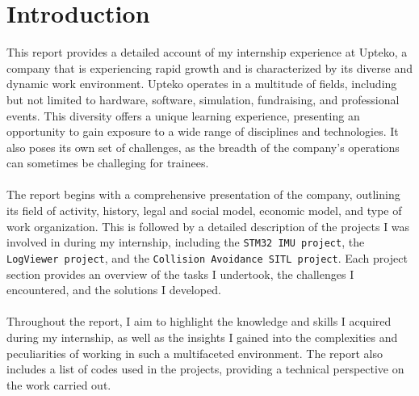 \chapter*{Introduction}

This report provides a detailed account of my internship experience at Upteko, a company that is experiencing rapid growth and is characterized by its diverse and dynamic work environment. Upteko operates in a multitude of fields, including but not limited to hardware, software, simulation, fundraising, and professional events. This diversity offers a unique learning experience, presenting an opportunity to gain exposure to a wide range of disciplines and technologies. It also poses its own set of challenges, as the breadth of the company's operations can sometimes be challeging for trainees.
\\ \\
The report begins with a comprehensive presentation of the company, outlining its field of activity, history, legal and social model, economic model, and type of work organization. This is followed by a detailed description of the projects I was involved in during my internship, including the \texttt{STM32 IMU project}, the \texttt{LogViewer project}, and the \texttt{Collision Avoidance SITL project}. Each project section provides an overview of the tasks I undertook, the challenges I encountered, and the solutions I developed.
\\ \\
Throughout the report, I aim to highlight the knowledge and skills I acquired during my internship, as well as the insights I gained into the complexities and peculiarities of working in such a multifaceted environment. The report also includes a list of codes used in the projects, providing a technical perspective on the work carried out.